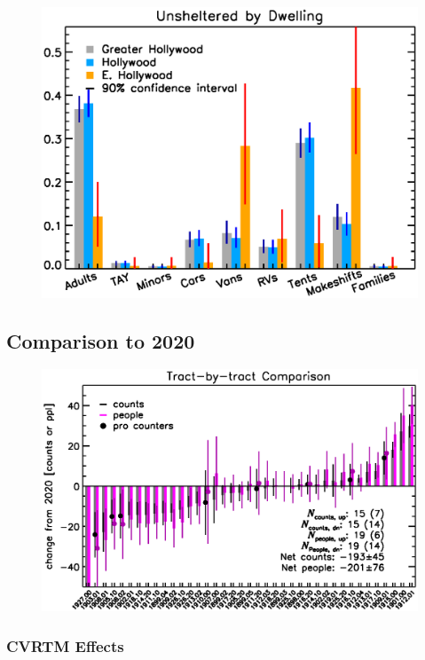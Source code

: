 \documentclass[11pt,twocolumn]{article}
\begin{document}
\begin{figure}[]
	\centering
	\includegraphics[width =\linewidth]{allTracts/allBreakdownBar}
	\caption{}
\end{figure}

\subsection{Comparison to 2020}
\label{sec:comp}

\begin{figure}[]
	\centering
	\includegraphics[width = \linewidth, trim = 0cm 0cm 0cm 0cm]{tractsYrYr}
	\caption{}
	\label{fig:tractYrYr}
\end{figure}


\subsubsection{CVRTM Effects}
\label{sec:CVRTM}
\end{document}
